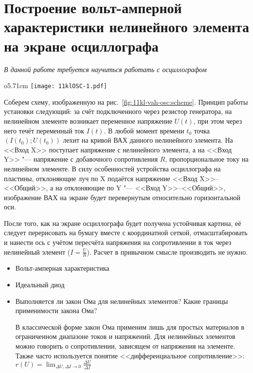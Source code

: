 \section{Построение вольт-амперной характеристики нелинейного элемента на экране осциллографа}
{\itshape В данной работе требуется научиться работать с осциллографом}
\SolveVariant
\begin{wrapfigure}{o}{5.71cm}
	\texttt{[image: 11klOSC-1.pdf]}
    \caption{Схема установки}
    \label{fig:11kl-vah-osc:scheme}
\end{wrapfigure}
Соберем схему, изображенную на рис.~\ref{fig:11kl-vah-osc:scheme}. Принцип работы установки следующий: за счёт подключенного через резистор генератора, на нелинейном элементе возникает переменное напряжение \(U(t)\), при этом через него течёт переменный ток \(I(t)\). В любой момент времени \(t_0\) точка \( \left( I(t_0); U(t_0) \right)\) лехит на кривой ВАХ данного нелинейного элемента. На <<Вход X>> поступает напряжение с нелинейного элемента, а на <<Вход Y>> "--- напряжение с добавочного сопротивления \(R\), пропорциональное току на нелинейном элементе. В силу особенностей устройства осциллографа на пластины, отклоняющие луч по X подаётся напряжение <<Вход X>>--<<Общий>>, а на отклоняющие по Y "--- <<Вход Y>>--<<Общий>>, изображение ВАХ на экране будет перевернутым относительно горизонтальной оси.\par
После того, как на экране осциллографа будет получена устойчивая картина, её следует перерисовать на бумагу вместе с координатной сеткой, отмасштабировать и нанести ось с учётом пересчёта напряжения на сопротивлении в ток через нелинейный элемент (\(I = \frac{U}{R}\)).
\MesErrors
Расчет в привычном смысле производить не нужно.
\SchoolBase
\begin{itemize}
    \item Вольт-амперная характеристика
    \item Идеальный диод
\end{itemize}
\AdditionalQuestions
\begin{itemize}
    \item Выполняется ли закон Ома для нелинейных элементов? Какие границы применимости закона Ома?\par
    \Answer В классической форме закон Ома применим лишь для простых материалов в ограниченном диапазоне токов и напряжений. Для нелинейных элементов можно говорить о сопротивлении, зависящем от напряжения на элементе. Также часто используется понятие <<дифференциальное сопротивление>>: $r(U) = \lim _ {\Delta U, \Delta I \rightarrow 0}\frac{\Delta U}{\Delta I}$
\end{itemize}
